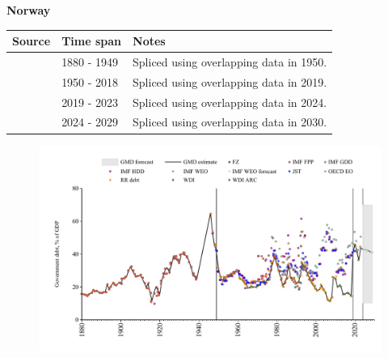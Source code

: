 \documentclass[12pt,a4paper,landscape]{article}
\begin{document}
\begin{adjustbox}{max totalsize={\paperwidth}{\paperheight},center}
\begin{minipage}[t][\textheight][t]{\textwidth}
\vspace*{0.5cm}
{}
\begin{center}
{\Large\bfseries Norway}
\end{center}
\vspace{0.5cm}
\begin{table}[H]
\centering
\small
\begin{tabular}{|l|l|l|}
\hline
\textbf{Source} & \textbf{Time span} & \textbf{Notes} \\
\hline
\rowcolor{white}\cite{IMF_FPP}& 1880 - 1949 &Spliced using overlapping data in 1950.\\
\rowcolor{lightgray}\cite{IMF_GDD}& 1950 - 2018 &Spliced using overlapping data in 2019.\\
\rowcolor{white}\cite{IMF_FPP}& 2019 - 2023 &Spliced using overlapping data in 2024.\\
\rowcolor{lightgray}\cite{IMF_WEO_forecast}& 2024 - 2029 &Spliced using overlapping data in 2030.\\
\hline
\end{tabular}
\end{table}
\begin{figure}[H]
\centering
\includegraphics[width=\textwidth,height=0.6\textheight,keepaspectratio]{graphs/NOR_govdebt_GDP.pdf}
\end{figure}
\end{minipage}
\end{adjustbox}
\end{document}
